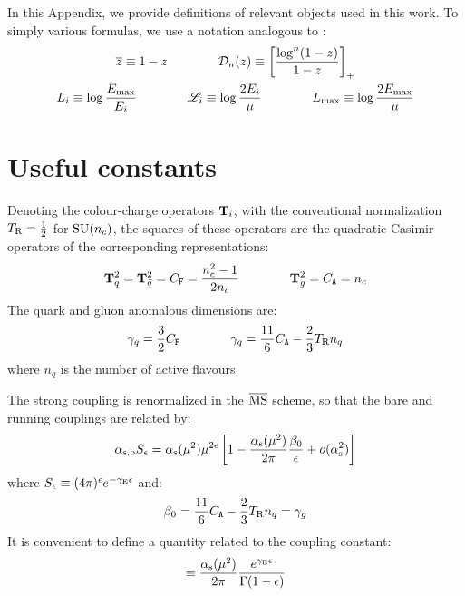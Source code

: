 
In this Appendix, we provide definitions of relevant objects used in this work. To simply various formulas, we use a notation analogous to \cite{rontsch-2503}:
\begin{equation}
  \begin{gathered}
    \overline{z} \equiv 1 - z
    \qquad \qquad
    \mathcal{D}_n(z) \equiv \left[ \frac{\log^n(1-z)}{1-z} \right]_+
    \\
    L_i \equiv \log \frac{E_\text{max}}{E_i}
    \qquad \qquad
    \mathscr{L}_i \equiv \log \frac{2E_i}{\mu}
    \qquad \qquad
    L_\text{max} \equiv \log \frac{2E_\text{max}}{\mu}
  \end{gathered}
\end{equation}

\section{Useful constants}

Denoting the colour-charge operators $ \mathbf{T}_i $, with the conventional normalization $ T_\text{R} = \frac{1}{2} $ for $ \mathrm{SU}(n_c) $, the squares of these operators are the quadratic Casimir operators of the corresponding representations:
\begin{equation}
  \mathbf{T}_q^2 = \mathbf{T}_{\bar{q}}^2 = C_\mathtt{F} = \frac{n_c^2 - 1}{2n_c}
  \qquad \qquad
  \mathbf{T}_g^2 = C_\mathtt{A} = n_c
\end{equation}
The quark and gluon anomalous dimensions are:
\begin{equation}
  \gamma_q = \frac{3}{2} C_\mathtt{F}
  \qquad \qquad
  \gamma_q = \frac{11}{6} C_\mathtt{A} - \frac{2}{3} T_\text{R} n_q
\end{equation}
where $ n_q $ is the number of active flavours.

The strong coupling is renormalized in the $ \overline{\text{MS}} $ scheme, so that the bare and running couplings are related by:
\begin{equation}
  \alpha_\text{s,b} S_\epsilon = \alpha_\text{s}(\mu^2) \mu^{2\epsilon} \left[ 1 - \frac{\alpha_\text{s}(\mu^2)}{2\pi} \frac{\beta_0}{\epsilon} + o(\alpha_\text{s}^2) \right]
\end{equation}
where $ S_\epsilon \equiv (4\pi)^\epsilon e^{-\gamma_\text{E} \epsilon} $ and:
\begin{equation}
  \beta_0 = \frac{11}{6} C_\mathtt{A} - \frac{2}{3} T_\text{R} n_q = \gamma_g
\end{equation}
It is convenient to define a quantity related to the coupling constant:
\begin{equation}
  [\rc] \equiv \frac{\rcr}{2\pi} \frac{e^{\eg \de}}{\Gamma(1-\de)}
\end{equation}

